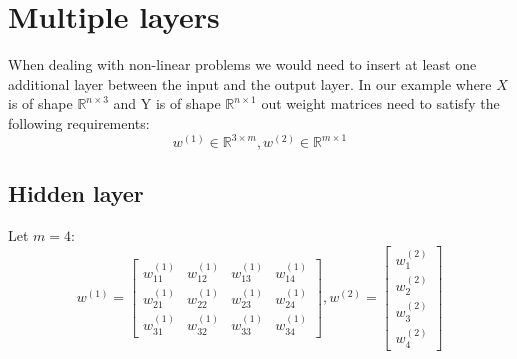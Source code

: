 \documentclass[10pt,a4paper]{article}
\begin{document}
\newpage

\section{Multiple layers}
When dealing with non-linear problems we would need to insert at least one additional layer between the input and the output layer.
In our example where $X$ is of shape $\mathbb{R}^{n \times 3}$ and Y is of shape $\mathbb{R}^{n \times 1}$ out weight matrices need to satisfy the following requirements:
\begin{equation}
	w^{(1)} \in \mathbb{R}^{3 \times m},
	w^{(2)} \in \mathbb{R}^{m \times 1}
\end{equation}

\subsection{Hidden layer}
Let $m=4$:
\begin{equation}
	w^{(1)} =
	\begin{bmatrix}
		w^{(1)}_{11} & w^{(1)}_{12} & w^{(1)}_{13} & w^{(1)}_{14} \\
		w^{(1)}_{21} & w^{(1)}_{22} & w^{(1)}_{23} & w^{(1)}_{24} \\
		w^{(1)}_{31} & w^{(1)}_{32} & w^{(1)}_{33} & w^{(1)}_{34}
	\end{bmatrix},
	w^{(2)} =
	\begin{bmatrix}
		w^{(2)}_{1} \\
		w^{(2)}_{2} \\
		w^{(2)}_{3} \\
		w^{(2)}_{4}
	\end{bmatrix}
\end{equation}
\end{document}
